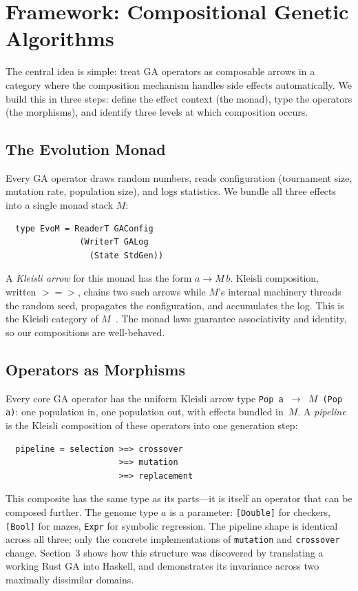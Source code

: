 \documentclass[dvipsnames,format=sigconf,anonymous=false,review=false]{acmart}
\begin{document}
\section{Framework: Compositional Genetic Algorithms}

The central idea is simple: treat GA operators as composable arrows in a category where the composition mechanism handles side effects automatically. We build this in three steps: define the effect context (the monad), type the operators (the morphisms), and identify three levels at which composition occurs.

\subsection{The Evolution Monad}

Every GA operator draws random numbers, reads configuration (tournament size, mutation rate, population size), and logs statistics. We bundle all three effects into a single monad stack $M$:

\begin{verbatim}
  type EvoM = ReaderT GAConfig
               (WriterT GALog
                 (State StdGen))
\end{verbatim}

\noindent A \emph{Kleisli arrow} for this monad has the form $a \to M\,b$. Kleisli composition, written $\mathbin{>\!\!=\!\!>}$, chains two such arrows while $M$'s internal machinery threads the random seed, propagates the configuration, and accumulates the log. This is the Kleisli category of $M$~\cite{maclane1971categories, moggi1991notions}. The monad laws guarantee associativity and identity, so our compositions are well-behaved.

\subsection{Operators as Morphisms}

Every core GA operator has the uniform Kleisli arrow type \texttt{Pop\,a $\to$ $M$\,(Pop\,a)}: one population in, one population out, with effects bundled in~$M$. A \emph{pipeline} is the Kleisli composition of these operators into one generation step:

\begin{verbatim}
  pipeline = selection >=> crossover
                       >=> mutation
                       >=> replacement
\end{verbatim}

\noindent This composite has the same type as its parts---it is itself an operator that can be composed further. The genome type $a$ is a parameter: \texttt{[Double]} for checkers, \texttt{[Bool]} for mazes, \texttt{Expr} for symbolic regression. The pipeline shape is identical across all three; only the concrete implementations of \texttt{mutation} and \texttt{crossover} change. Section~3 shows how this structure was discovered by translating a working Rust GA into Haskell, and demonstrates its invariance across two maximally dissimilar domains.
\end{document}
